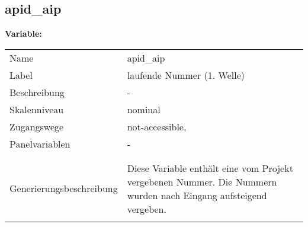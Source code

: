 	
	
	\subsection{apid\_aip}
	\label{subSection:apid_aip}

	\noindent\textbf{Variable:}\\
		\begin{tabular}{lL{11.3cm}}
			\label{tableVariable:apid_aip}
			Name & apid\_aip \\
			Label & laufende Nummer (1. Welle) \\
			Beschreibung & - \\
			Skalenniveau & nominal \\
			Zugangswege &
				not-accessible,
 \\
			Panelvariablen & -
			 \\
			 \\
 \\
					Generierungsbeschreibung & Diese Variable enthält eine vom Projekt vergebenen Nummer. Die Nummern wurden nach Eingang aufsteigend vergeben. 
				 \\	
			 \\
		\end{tabular}






	
	\newpage
